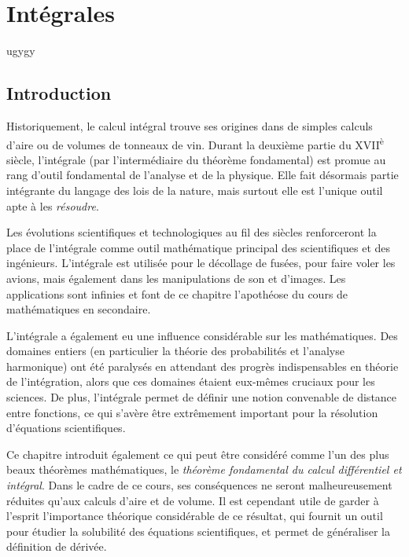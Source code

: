 \documentclass[main.tex]{subfiles}
\begin{document}
\onlyinsubfile{%
    \maketitle
    
    \tableofcontents
}

\chapter{Intégrales}

ugygy

\section{Introduction}

Historiquement,
le calcul intégral trouve ses origines dans de simples calculs d'aire ou de volumes de tonneaux de vin.
Durant la deuxième partie du XVII\textsuperscript{è} siècle,
l'intégrale (par l'intermédiaire du théorème fondamental)
est promue au rang d'outil fondamental de l'analyse et de la physique.
Elle fait désormais partie intégrante du langage des lois de la nature,
mais surtout elle est l'unique outil apte à les \emph{résoudre}.

Les évolutions scientifiques et technologiques au fil des siècles
renforceront la place de l'intégrale comme outil mathématique principal des scientifiques et des ingénieurs.
L'intégrale est utilisée pour le décollage de fusées, pour faire voler les avions,
mais également dans les manipulations de son et d'images.
Les applications sont infinies et font de ce chapitre l'apothéose du cours de mathématiques en secondaire.

L'intégrale a également eu une influence considérable sur les mathématiques.
Des domaines entiers (en particulier la théorie des probabilités et l'analyse harmonique)
ont été paralysés en attendant des progrès indispensables en théorie de l'intégration,
alors que ces domaines étaient eux-mêmes cruciaux pour les sciences.
De plus, l'intégrale permet de définir une notion convenable de distance entre fonctions,
ce qui s'avère être extrêmement important pour la résolution d'équations scientifiques.

Ce chapitre introduit également ce qui peut être considéré comme l'un des plus beaux théorèmes mathématiques,
le \emph{théorème fondamental du calcul différentiel et intégral}.
Dans le cadre de ce cours,
ses conséquences ne seront malheureusement réduites qu'aux calculs d'aire et de volume.
Il est cependant utile de garder à l'esprit l'importance théorique considérable de ce résultat,
qui fournit un outil pour étudier la solubilité des équations scientifiques,
et permet de généraliser la définition de dérivée.
\end{document}
